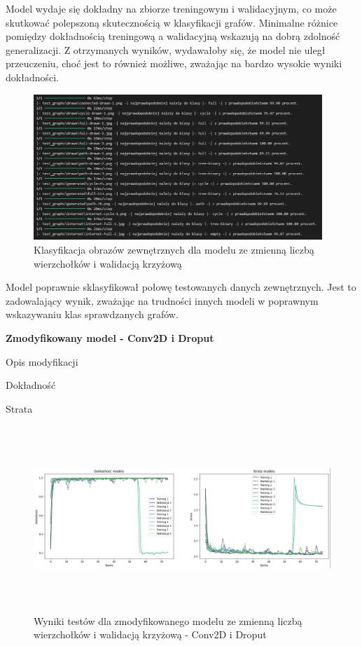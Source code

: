 Model wydaje się dokładny na zbiorze treningowym i walidacyjnym,
co może skutkować polepszoną skutecznością w klasyfikacji grafów.
Minimalne różnice pomiędzy dokładnością treningową a walidacyjną wskazują na dobrą zdolność generalizacji.
Z otrzymanych wyników, wydawałoby się, że model nie uległ przeuczeniu,
choć jest to również możliwe, zważając na bardzo wysokie wyniki dokładności. 

\begin{figure}[ht]
	\centering
	\includegraphics[height=5.5cm]{resources/tests/images/v3/multiple_edges_crossvalid_txt.png}
	\caption{Klasyfikacja obrazów zewnętrznych dla modelu ze zmienną liczbą wierzchołków i walidacją krzyżową}
	\label{Fig:tests-csvar-2}
\end{figure}
\FloatBarrier

Model poprawnie sklasyfikował połowę testowanych danych zewnętrznych.
Jest to zadowalający wynik, zważając na trudności innych modeli w poprawnym wskazywaniu klas sprawdzanych grafów.

\textbf{Zmodyfikowany model - Conv2D i Droput}

Opis modyfikacji %

Dokładność %

Strata %

\begin{figure}[ht]
	\centering
	\includegraphics[height=7cm]{resources/tests/images/v4/multiple_edges_crossvalid_1_img.png}
	\caption{Wyniki testów dla zmodyfikowanego modelu ze zmienną liczbą wierzchołków i walidacją krzyżową - Conv2D i Droput}
	\label{Fig:tests-var-2}
\end{figure}
\FloatBarrier

